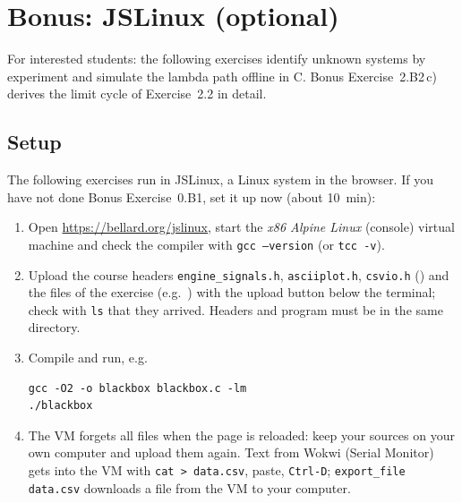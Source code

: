\section*{Bonus: JSLinux (optional)}
\begingroup
\setcounter{exercise}{0}
For interested students: the following exercises identify unknown systems by
experiment and simulate the lambda path offline in C. Bonus Exercise~2.B2\,c)
derives the limit cycle of Exercise~2.2 in detail.

\subsection*{Setup}
The following exercises run in JSLinux, a Linux system in the browser. If
you have not done Bonus Exercise~0.B1, set it up now (about \SI{10}{min}):
\begin{enumerate}
  \item Open \url{https://bellard.org/jslinux}, start the \emph{x86 Alpine
    Linux} (console) virtual machine and check the compiler with
    \texttt{gcc --version} (or \texttt{tcc -v}).
  \item Upload the course headers \texttt{engine\_signals.h},
    \texttt{asciiplot.h}, \texttt{csvio.h} () and the
    files of the exercise (e.g.\ ) with the
    upload button below the terminal; check with \texttt{ls} that they arrived.
    Headers and program must be in the same directory.
  \item Compile and run, e.g.
\begin{lstlisting}[style=shell]
gcc -O2 -o blackbox blackbox.c -lm
./blackbox
\end{lstlisting}
  \item The VM forgets all files when the page is reloaded: keep your sources
    on your own computer and upload them again. Text from Wokwi (Serial
    Monitor) gets into the VM with \texttt{cat > data.csv}, paste,
    \texttt{Ctrl-D}; \texttt{export\_file data.csv} downloads a file from
    the VM to your computer.
\end{enumerate}

